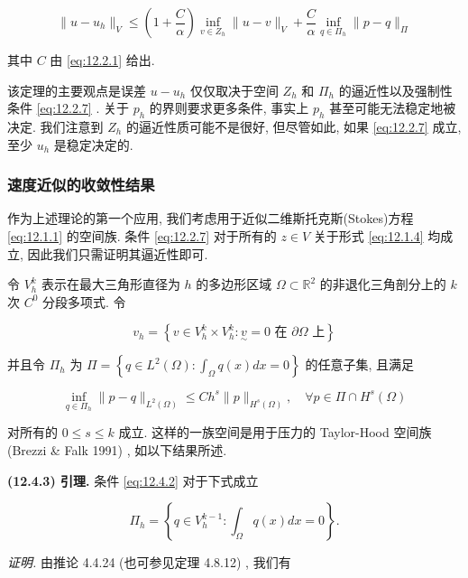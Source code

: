$$
\|u - u_{h}\|_{V} \leq \left( 1 + \frac{C}{\alpha} \right) \inf_{v \in Z_{h}} \|u - v\|_{V} + \frac{C}{\alpha} \inf_{q \in \varPi_{h}} \|p - q\|_{\varPi}
$$

其中 $C$ 由 \eqref{eq:12.2.1} 给出.

该定理的主要观点是误差 $u - u_{h}$ 仅仅取决于空间 $Z_{h}$ 和 $\varPi_{h}$ 的逼近性以及强制性条件 \eqref{eq:12.2.7} . 关于 $p_{h}$ 的界则要求更多条件, 事实上 $p_{h}$ 甚至可能无法稳定地被决定. 我们注意到 $Z_{h}$ 的逼近性质可能不是很好, 但尽管如此, 如果 \eqref{eq:12.2.7} 成立, 至少 $u_{h}$ 是稳定决定的.
\subsubsection{速度近似的收敛性结果}

作为上述理论的第一个应用, 我们考虑用于近似二维斯托克斯(Stokes)方程 \eqref{eq:12.1.1} 的空间族. 条件 \eqref{eq:12.2.7} 对于所有的 $z \in V$ 关于形式 \eqref{eq:12.1.4} 均成立, 因此我们只需证明其逼近性即可.

令 $V_{h}^{k}$ 表示在最大三角形直径为 $h$ 的多边形区域 $\Omega \subset \mathbb{R}^{2}$ 的非退化三角剖分上的 $k$ 次 $C^{0}$ 分段多项式. 令

\begin{equation}\label{eq:12.4.1}
v_{h} = \left\{ v \in V_{h}^{k} \times V_{h}^{k} : \underset{\sim}{v} = 0 \text{ 在 } \partial \Omega \text{ 上} \right\}
\end{equation}

并且令 $\varPi_{h}$ 为 $\varPi = \left\{ q \in L^{2}(\Omega) : \int_{\Omega} q(x) dx = 0 \right\}$ 的任意子集, 且满足

\begin{equation}\label{eq:12.4.2}
\inf_{q \in \varPi_{h}} \|p - q\|_{L^{2}(\Omega)} \leq C h^{s} \|p\|_{H^{s}(\Omega)}, \quad \forall p \in \varPi \cap H^{s}(\Omega)
\end{equation}

对所有的 $0 \leq s \leq k$ 成立. 这样的一族空间是用于压力的 Taylor-Hood 空间族 (Brezzi \& Falk 1991) , 如以下结果所述.

\textbf{(12.4.3) 引理.} 条件 \eqref{eq:12.4.2} 对于下式成立

\begin{equation}\label{eq:12.4.4}
\varPi_{h} = \left\{ q \in V_{h}^{k - 1} : \int_{\Omega} q(x) dx = 0 \right\}.
\end{equation}

\textit{证明.} 由推论 4.4.24 (也可参见定理 4.8.12) , 我们有

